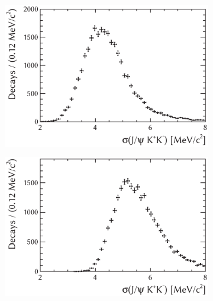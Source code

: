 \begin{figure}[tbp]
  \centering
  \begin{subfigure}{0.49\textwidth}
    \includegraphics[width=\textwidth]{graphics/analysis/JpsiKKMassErr_left}
    \caption{}
    \label{fig:JpsiKKMassErr_left}
  \end{subfigure}%
  \hfill%
  \begin{subfigure}{0.49\textwidth}
    \includegraphics[width=\textwidth]{graphics/analysis/JpsiKKMassErr_right}
    \caption{}
    \label{fig:JpsiKKMassErr_right}
  \end{subfigure}


\end{figure}
